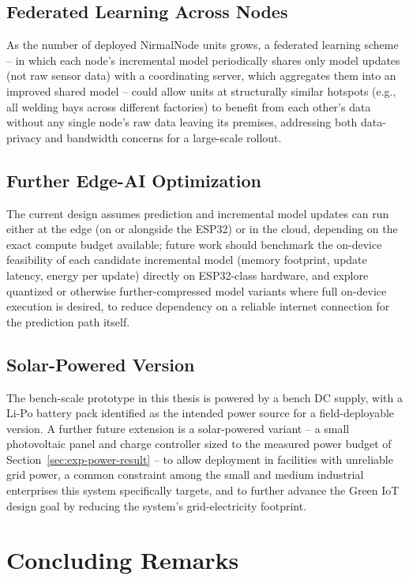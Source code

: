\subsection{Federated Learning Across Nodes}
\label{sec:future-federated}
As the number of deployed NirmalNode units grows, a federated learning scheme -- in which each node's incremental model periodically shares only model updates (not raw sensor data) with a coordinating server, which aggregates them into an improved shared model -- could allow units at structurally similar hotspots (e.g., all welding bays across different factories) to benefit from each other's data without any single node's raw data leaving its premises, addressing both data-privacy and bandwidth concerns for a large-scale rollout.

\subsection{Further Edge-AI Optimization}
\label{sec:future-edge-ai}
The current design assumes prediction and incremental model updates can run either at the edge (on or alongside the ESP32) or in the cloud, depending on the exact compute budget available; future work should benchmark the on-device feasibility of each candidate incremental model (memory footprint, update latency, energy per update) directly on ESP32-class hardware, and explore quantized or otherwise further-compressed model variants where full on-device execution is desired, to reduce dependency on a reliable internet connection for the prediction path itself.

\subsection{Solar-Powered Version}
\label{sec:future-solar}
The bench-scale prototype in this thesis is powered by a bench DC supply, with a Li-Po battery pack identified as the intended power source for a field-deployable version. A further future extension is a solar-powered variant -- a small photovoltaic panel and charge controller sized to the measured power budget of Section~\ref{sec:exp-power-result} -- to allow deployment in facilities with unreliable grid power, a common constraint among the small and medium industrial enterprises this system specifically targets, and to further advance the Green IoT design goal by reducing the system's grid-electricity footprint.

\section{Concluding Remarks}
\label{sec:conc-remarks}

